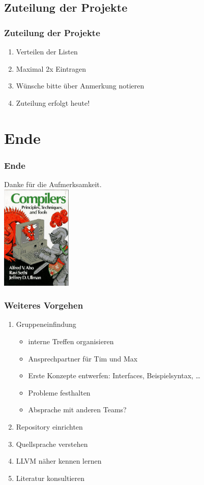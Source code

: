 \documentclass[ucs,9pt]{beamer}
\begin{document}
\subsection{Zuteilung der Projekte}
\begin{frame}
  \frametitle{Zuteilung der Projekte}
  \begin{enumerate}
    \item Verteilen der Listen
    \item Maximal 2x Eintragen
    \item Wünsche bitte über Anmerkung notieren
    \item Zuteilung erfolgt heute!
  \end{enumerate}
\end{frame}

\section{Ende}
\begin{frame}
  \frametitle{Ende}
  \begin{center}
    \Huge
    Danke für die Aufmerksamkeit.\\[1em]
    \includegraphics[height=5cm]{compilers}
    \ 
  \end{center}
\end{frame}

\begin{frame}
  \frametitle{Weiteres Vorgehen}
  \begin{enumerate}
    \item Gruppeneinfindung
      \begin{itemize}
        \item interne Treffen organisieren
        \item Ansprechpartner für Tim und Max
        \item Erste Konzepte entwerfen: Interfaces, Beispielsyntax, \dots
        \item Probleme festhalten
        \item Absprache mit anderen Teams?
      \end{itemize}
    \item Repository einrichten
    \item Quellsprache verstehen
    \item LLVM näher kennen lernen
    \item Literatur konsultieren
  \end{enumerate}
\end{frame}
\end{document}
